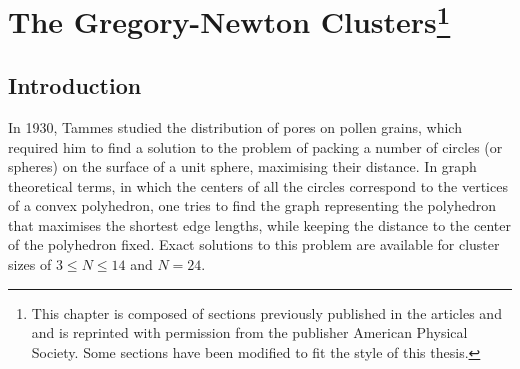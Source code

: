 \chapter[The Gregory-Newton Clusters]{The Gregory-Newton Clusters\footnote{This
    chapter is composed of sections previously published in the articles
    \autocite{Trombach_stickyhardsphereLennardJonestypeclusters_2018}
    and
    \autocite{Trombach_GregoryNewtonproblemkissing_2018}
    and is reprinted with permission from the publisher 
    American Physical Society. Some sections have been modified to fit the style
    of this thesis.}}
\label{sec:thegregorynewtonclusters}

\section{Introduction}
\label{sec:introductiongregorynewton}

In 1930, Tammes studied the distribution of pores on pollen grains, which
required him to find a solution to the problem of packing a number of circles
(or spheres) on the surface of a unit sphere, maximising their
distance.\autocite{Tammes_originnumberarrangement_1930} In graph theoretical
terms, in which the centers of all the circles correspond to the vertices of a
convex polyhedron, one tries to find the graph representing the polyhedron that
maximises the shortest edge lengths, while keeping the distance to the center of
the polyhedron fixed. Exact solutions to this problem are available for cluster
sizes of $3 \leq N \leq 14$ and
$N=24$.\autocite{Robinson_Arrangement24points_1961,Musin_TammesProblem14_2015}

